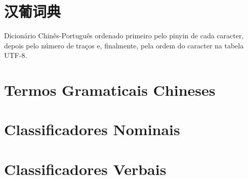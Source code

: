 \documentclass[a4paper,9pt,twoside,openright,book]{memoir}
\begin{document}



\clearpage
\pagestyle{empty}
\tableofcontents

\clearpage
\pagestyle{empty}
\chapter{汉葡词典}

%
%

Dicionário Chinês-Português ordenado primeiro pelo pinyin de cada
caracter, depois pelo número de traços e, finalmente, pela ordem do
caracter na tabela UTF-8.

\clearpage
\pagestyle{dictionary}
\twocolumn























\onecolumn

\ifdraftdoc
\else

\clearpage
\pagestyle{plain}
\chapter{Termos Gramaticais Chineses}


\clearpage
\pagestyle{plain}
\chapter{Classificadores Nominais}


\clearpage
\pagestyle{plain}
\chapter{Classificadores Verbais}

\end{document}
